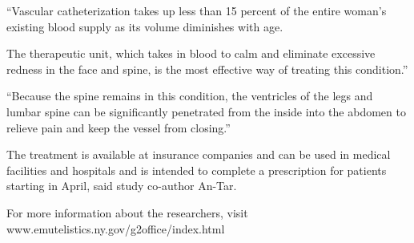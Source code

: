 \documentclass{article}
\begin{document}
“Vascular catheterization takes up less than 15 percent of the entire woman’s existing blood supply as its volume diminishes with age.

The therapeutic unit, which takes in blood to calm and eliminate excessive redness in the face and spine, is the most effective way of treating this condition.”

“Because the spine remains in this condition, the ventricles of the legs and lumbar spine can be significantly penetrated from the inside into the abdomen to relieve pain and keep the vessel from closing.”

The treatment is available at insurance companies and can be used in medical facilities and hospitals and is intended to complete a prescription for patients starting in April, said study co-author An-Tar.

For more information about the researchers, visit www.emutelistics.ny.gov/g2office/index.html
\end{document}
